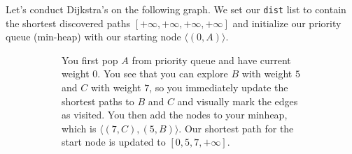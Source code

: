   \begin{example}
    Let's conduct Dijkstra's on the following graph. We set our \texttt{dist} list to contain the shortest discovered paths $[+\infty, +\infty, +\infty, +\infty]$ and initialize our priority queue (min-heap) with our starting node $\langle (0, A) \rangle$.
    \begin{figure}[H]
      \centering
      \begin{subfigure}[b]{0.48\textwidth}
        \centering
        \caption{You first pop $A$ from priority queue and have current weight $0$. You see that you can explore $B$ with weight $5$ and $C$ with weight $7$, so you immediately update the shortest paths to $B$ and $C$ and visually mark the edges as visited. You then add the nodes to your minheap, which is $\langle (7, C), (5, B) \rangle$. Our shortest path for the start node is updated to $[0, 5, 7, +\infty]$.}
      \end{subfigure}
      \hfill 
      \begin{subfigure}[b]{0.48\textwidth}
        \centering
\end{subfigure}
\end{figure}
\end{example}
